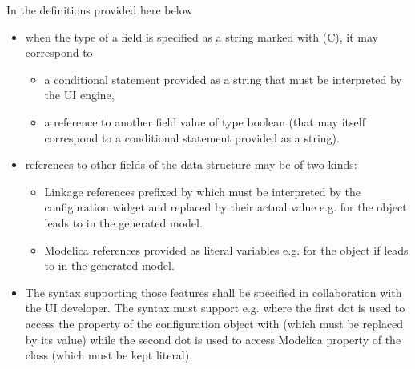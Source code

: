 \documentclass[letterpaper,10pt, openany,english]{sphinxmanual}
\begin{document}
In the definitions provided here below
\begin{itemize}
\item {} 
when the type of a field is specified as a string marked with (C), it may correspond to
\begin{itemize}
\item {} 
a conditional statement provided as a string that must be interpreted by the UI engine,

\item {} 
a reference to another field value of type boolean (that may itself correspond to a conditional statement provided as a string).

\end{itemize}

\item {} 
references to other fields of the data structure may be of two kinds:
\begin{itemize}
\item {} 
Linkage references prefixed by \sphinxcode{\sphinxupquote{\#}} which must be interpreted by the configuration widget and replaced by their actual value e.g.  for the object  leads to  in the generated model.

\item {} 
Modelica references provided as literal variables e.g.  for the object if  leads to  in the generated model.

\end{itemize}

\item {} 
The syntax supporting those features shall be specified in collaboration with the UI developer. The syntax must support e.g.  where the first dot is used to access the property  of the configuration object with  (which must be replaced by its value) while the second dot is used to access Modelica property  of the class  (which must be kept literal).

\end{itemize}
\end{document}
